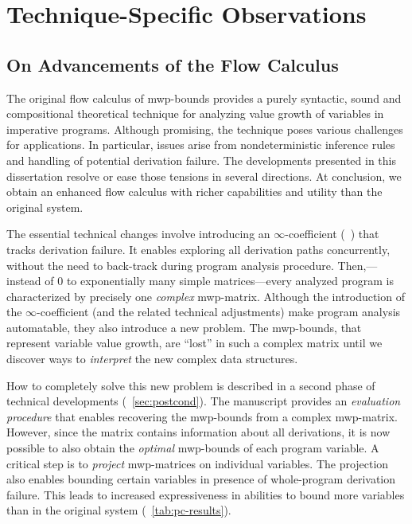 
\section{Technique-Specific Observations}
\label{sec:res-specific}

\subsection{On Advancements of the Flow Calculus}
\label{subsec:res-flow-calc}

The original flow calculus of mwp-bounds provides a purely syntactic, sound and compositional theoretical technique for analyzing value growth of variables in imperative programs.
Although promising, the technique poses various challenges for applications.
In particular, issues arise from nondeterministic inference rules and handling of potential derivation failure.
The developments presented in this dissertation resolve or ease those tensions in several directions.
At conclusion, we obtain an enhanced flow calculus with richer capabilities and utility than the original system.

The essential technical changes involve introducing an \(\infty\)-coefficient (\cf~) that tracks derivation failure.
It enables exploring all derivation paths {concurrently}, \ie without the need to back-track during program analysis procedure.
Then,---instead of 0 to exponentially many simple matrices---every analyzed program is characterized by precisely one \emph{complex} mwp-matrix.
Although the introduction of the \(\infty\)-coefficient (and the related technical adjustments) make program analysis automatable,
they also introduce a new problem.
The mwp-bounds, that represent variable value growth, are \enquote{lost} in such a complex matrix until
we discover ways to \emph{interpret} the new complex data structures.

How to completely solve this new problem is described in a second phase of technical developments (\cf~\autoref{sec:postcond}).
The manuscript provides an \emph{evaluation procedure} that enables recovering the mwp-bounds from a complex mwp-matrix.
However, since the matrix contains information about all derivations, it is now possible to also obtain the \emph{optimal} mwp-bounds of each program variable.
A critical step is to \emph{project} mwp-matrices on individual variables.
The projection also enables bounding certain variables in presence of whole-program derivation failure.
This leads to increased expressiveness in abilities to bound more variables than in the original system (\cf~\autoref{tab:pc-results}).


